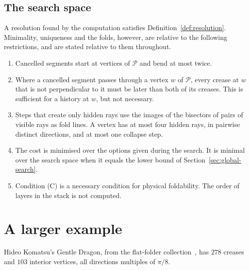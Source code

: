\documentclass[11pt]{article}
\theoremstyle{definition}
\theoremstyle{remark}
\begin{document}
\subsection{The search space}\label{sec:space}

A resolution found by the computation satisfies Definition~\ref{def:resolution}. Minimality, uniqueness and the folds, however, are relative to the following restrictions, and are stated relative to them throughout.
\begin{enumerate}
\item Cancelled segments start at vertices of $\mathcal P$ and bend at most twice.
\item Where a cancelled segment passes through a vertex $w$ of $\mathcal P$, every crease at $w$ that is not perpendicular to it must be later than both of its creases. This is sufficient for a history at $w$, but not necessary.
\item Steps that create only hidden rays use the images of the bisectors of pairs of visible rays as fold lines. A vertex has at most four hidden rays, in pairwise distinct directions, and at most one collapse step.
\item The cost is minimised over the options given during the search. It is minimal over the search space when it equals the lower bound of Section~\ref{sec:global-search}.
\item Condition (C) is a necessary condition for physical foldability. The order of layers in the stack is not computed.
\end{enumerate}

\section{A larger example}\label{sec:dragon}

Hideo Komatsu's Gentle Dragon, from the flat-folder collection~\cite{flatfolder}, has $278$ creases and $103$ interior vertices, all directions multiples of $\pi/8$.
\end{document}
